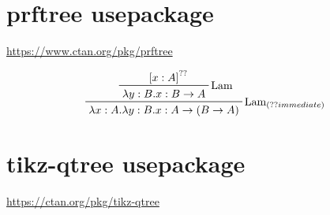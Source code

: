 \documentclass[12pt, a4paper]{article}
\begin{document}
\section*{prftree usepackage}
 
\url{https://www.ctan.org/pkg/prftree}

\begin{displaymath}
 \prftree[r]{$\mathrm{Lam}_{(\prfref<assum:A>)}$}{
        \prftree[r]{$\mathrm{Lam}$}
        {\prfboundedassumption<assum:A>{x:A}}
        {\lambda y:B.x: B\to A}
    }
{\lambda x:A.\lambda y:B.x : A\to (B\to A)}
\end{displaymath}

\section*{tikz-qtree usepackage}

\url{https://ctan.org/pkg/tikz-qtree}

\end{document}
